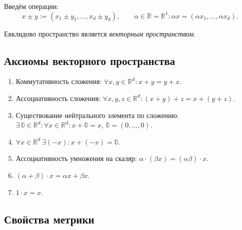 \documentclass[12pt,a4paper]{report}
\begin{document}

Введём операции:
\[
    x\pm y:=(x_1\pm y_1,\ldots,x_d\pm y_d),
    \qquad
    \alpha\in\mathbb{R}=\mathbb{R}^1\colon
    \alpha x=(\alpha x_1,\ldots,\alpha x_d).
\]

Евклидово пространство является \textit{векторным пространством}.

\subsection{Аксиомы векторного пространства}

\begin{enumerate}
    \item Коммутативность сложения: $\forall x,y\in\mathbb{R}^d\colon x+y=y+x$.
    \item Ассоциативность сложения: $\forall x,y,z\in\mathbb{R}^d\colon (x+y)+z=x+(y+z)$.
    \item Существование нейтрального элемента по сложению: $\exists\,\mathbb{0}\in\mathbb{R}^d\colon \forall x\in\mathbb{R}^d\colon x+\mathbb{0}=x$, $\mathbb{0}=(0,\ldots,0)$.
    \item $\forall x\in\mathbb{R}^d\ \exists(-x)\colon x+(-x)=\mathbb{0}$.
    \item Ассоциативность умножения на скаляр: $\alpha\cdot(\beta x)=(\alpha\beta)\cdot x$.
    \item $(\alpha+\beta)\cdot x=\alpha x+\beta x$.
    \item $1\cdot x=x$.
\end{enumerate}


\subsection{Свойства метрики}
\end{document}
